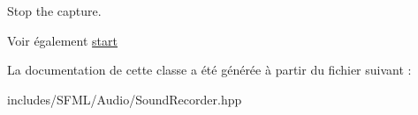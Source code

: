 Stop the capture. 

\begin{DoxySeeAlso}{Voir également}
\hyperlink{classsf_1_1SoundRecorder_a715f0fd2f228c83d79aaedca562ae51f}{start} 
\end{DoxySeeAlso}


La documentation de cette classe a été générée à partir du fichier suivant \+:\begin{DoxyCompactItemize}
\item 
includes/\+S\+F\+M\+L/\+Audio/Sound\+Recorder.\+hpp\end{DoxyCompactItemize}
